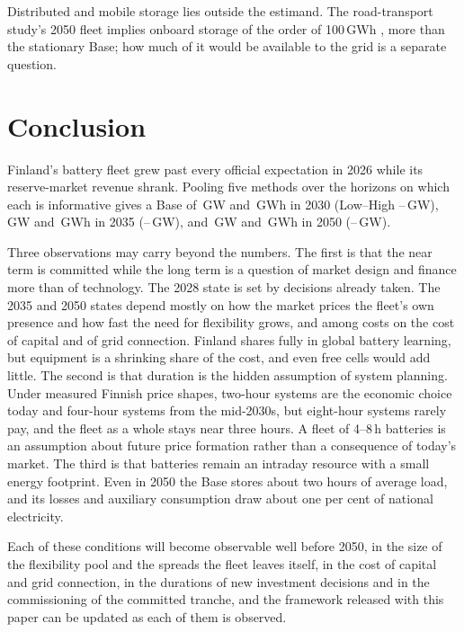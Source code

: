 \documentclass[11pt]{article}
\begin{document}
Distributed and mobile storage lies outside the estimand. The road-transport study's 2050 fleet implies onboard storage of the order of 100\,GWh \citep{merilehto2026road}, more than the stationary Base; how much of it would be available to the grid is a separate question.

\section{Conclusion}\label{sec:conclusion}
Finland's battery fleet grew past every official expectation in 2026 while its reserve-market revenue shrank.
Pooling five methods over the horizons on which each is informative gives a Base of \,GW and \,GWh in 2030 (Low--High --\,GW), \,GW and \,GWh in 2035 (--\,GW), and \,GW and \,GWh in 2050 (--\,GW).

Three observations may carry beyond the numbers.
The first is that the near term is committed while the long term is a question of market design and finance more than of technology. The 2028 state is set by decisions already taken. The 2035 and 2050 states depend mostly on how the market prices the fleet's own presence and how fast the need for flexibility grows, and among costs on the cost of capital and of grid connection. Finland shares fully in global battery learning, but equipment is a shrinking share of the cost, and even free cells would add little.
The second is that duration is the hidden assumption of system planning. Under measured Finnish price shapes, two-hour systems are the economic choice today and four-hour systems from the mid-2030s, but eight-hour systems rarely pay, and the fleet as a whole stays near three hours. A fleet of 4--8\,h batteries is an assumption about future price formation rather than a consequence of today's market.
The third is that batteries remain an intraday resource with a small energy footprint. Even in 2050 the Base stores about two hours of average load, and its losses and auxiliary consumption draw about one per cent of national electricity.

Each of these conditions will become observable well before 2050, in the size of the flexibility pool and the spreads the fleet leaves itself, in the cost of capital and grid connection, in the durations of new investment decisions and in the commissioning of the committed tranche, and the framework released with this paper can be updated as each of them is observed.
\end{document}
